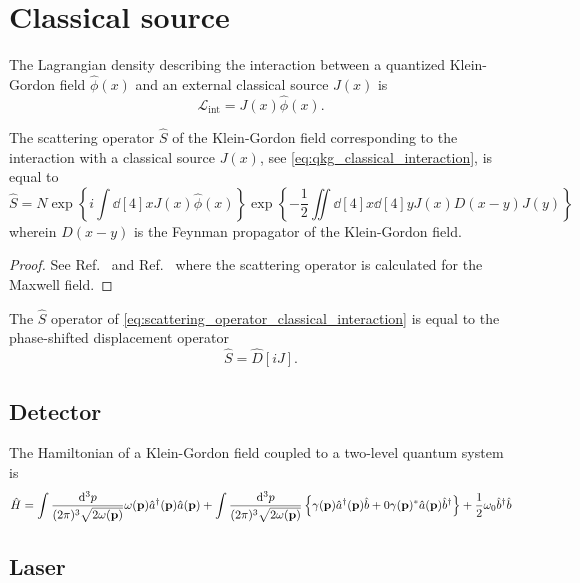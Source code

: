 \section{Classical source}

\begin{definition}
	The Lagrangian density describing the interaction between a quantized Klein-Gordon field $\hat\phi(x)$ and an external classical source $J(x)$ is
	\begin{equation}
		\mathcal{L}_\text{int}
		=
		J(x)
		\hat\phi(x)
		\label{eq:qkg_classical_interaction}
		.
	\end{equation}
\end{definition}
\begin{theorem}
	The scattering operator $\hat{S}$ of the Klein-Gordon field corresponding to the interaction with a classical source $J(x)$, see \cref{eq:qkg_classical_interaction}, is equal to
	\begin{equation}
		\hat{S}
		=
		N\exp\left\{
			i\int\dd[4]{x}
			J(x)
			\hat\phi(x)
		\right\}
		\exp\left\{
			-
			\frac{1}{2}
			\iint\dd[4]{x}\dd[4]{y}
			J(x)
			D(x-y)
			J(y)
		\right\}
		\label{eq:scattering_operator_classical_interaction}
	\end{equation}
	wherein $D(x-y)$ is the Feynman propagator of the Klein-Gordon field.
\end{theorem}
\begin{proof}
	See Ref.~\cite{Zhang1999} and Ref.~\cite[p.~180]{Itzykson2012} where the scattering operator is calculated for the Maxwell field.
\end{proof}
\begin{theorem}\label{thm:displacement_scattering_operator_equivalence}
	The $\hat{S}$ operator of \cref{eq:scattering_operator_classical_interaction} is equal to the phase-shifted displacement operator
	\begin{equation}
		\hat{S}
		=
		\hat{D}[iJ]
		.
	\end{equation}
\end{theorem}

\subsection{Detector}

\begin{example}
	The Hamiltonian of a Klein-Gordon field coupled to a two-level quantum system is
	\begin{equation}
		\hat{H}
		=
		\int\frac{\dd[3]{p}}{(2\pi)^3\sqrt{2\omega(\vb{p})}}
		\omega(\vb{p})
		\hat{a}^\dagger(\vb{p})
		\hat{a}(\vb{p})
		+
		\int\frac{\dd[3]{p}}{(2\pi)^3\sqrt{2\omega(\vb{p})}}
		\left\{
			\gamma(\vb{p})
			\hat{a}^\dagger(\vb{p})
			\hat{b}
			+0
			\gamma(\vb{p})^*
			\hat{a}(\vb{p})
			\hat{b}^\dagger
		\right\}
		+
		\frac{1}{2}
		\omega_0
		\hat{b}^\dagger
		\hat{b}
	\end{equation}
\end{example}

\subsection{Laser}